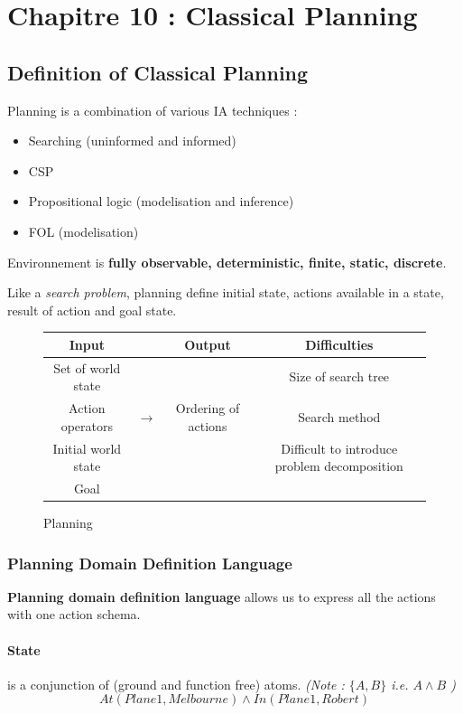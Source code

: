 \section{Chapitre 10 : Classical Planning }

\subsection{Definition of Classical Planning}

Planning is a combination of various IA techniques :
\begin{multicols}{2}
\begin{itemize}
    \item Searching (uninformed and informed)
    \item CSP
    \item Propositional logic (modelisation and inference)
    \item FOL (modelisation)
\end{itemize}
\end{multicols}

Environnement is \textbf{fully observable, deterministic, finite, static, discrete}.

Like a \textit{search problem}, planning define initial state, actions available in a state,
result of action and goal state.

\begin{figure}[h]
    \centering
\begin{tabular}{ccc|c}
    Input && Output & Difficulties \\
    \hline
        Set of world state &&& Size of search tree \\
        Action operators &$\to$& Ordering of actions & Search method\\
        Initial world state &&& Difficult to introduce problem decomposition \\
        Goal && \\
\end{tabular}
\caption{Planning}
\end{figure}

\subsubsection{Planning Domain Definition Language}

\textbf{Planning domain  definition language}  allows us to  express all
the actions with one action schema.

\paragraph{\textbf{State}} is a conjunction of (ground and function free) atoms. 
\textit{(Note : $\{A, B\}$ i.e. $A \wedge B$ )}
$$ At(Plane1, Melbourne) \wedge In(Plane1, Robert) $$

